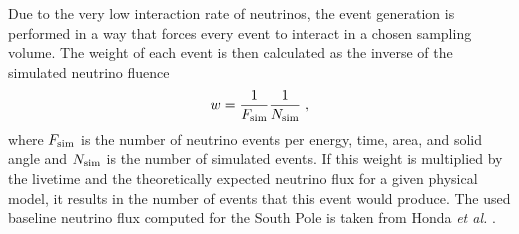 Due to the very low interaction rate of neutrinos, the event generation is performed in a way that forces every event to interact in a chosen sampling volume. The weight of each event is then calculated as the inverse of the simulated neutrino fluence
\begin{equation}
    w = \frac{1}{F_{\mathrm{sim}}} \frac{1}{N_{\mathrm{sim}}}
    \;,
    \labeq{neutrino_generation_weight}
\end{equation}
where $F_{\rm{sim}}$ is the number of neutrino events per energy, time, area, and solid angle and $N_{\rm{sim}}$ is the number of simulated events. If this weight is multiplied by the livetime and the theoretically expected neutrino flux for a given physical model, it results in the number of events that this event would produce. The used baseline neutrino flux computed for the South Pole is taken from Honda \textit{et al.} .

